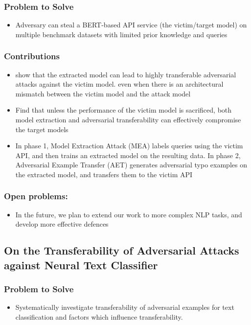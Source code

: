 \documentclass{article}
\begin{document}
\begin{flushleft}
\subsubsection*{Problem to Solve}
\begin{itemize}
    \item Adversary can steal a BERT-based API service (the victim/target model) on multiple benchmark datasets with limited prior knowledge and queries
\end{itemize}

\subsubsection*{Contributions}
\begin{itemize}
 \item show that the extracted model can lead to highly transferable adversarial attacks against the victim model.  even when there is an architectural mismatch between the victim model and the attack model
 \item Find that unless the performance of the victim model is sacrificed, both model extraction and adversarial transferability can effectively compromise the target models
 \item In phase 1, Model Extraction Attack (MEA) labels queries using the victim API, and then trains an extracted model on the resulting data. In phase 2, Adversarial Example Transfer (AET) generates adversarial typo examples on the extracted model, and transfers them to the victim API
\end{itemize}

\subsubsection*{Open problems:}
\begin{itemize}
  \item  In the future, we plan to extend our work to more complex NLP tasks, and develop more effective defences
\end{itemize}





\subsection{On the Transferability of Adversarial Attacks against Neural Text Classifier   \cite{yuan2020transferability}} 
\subsubsection*{Problem to Solve}
\begin{itemize}
    \item Systematically investigate transferability of adversarial examples for text classification and factors which influence transferability. 
\end{itemize}


\end{flushleft}
\end{document}
